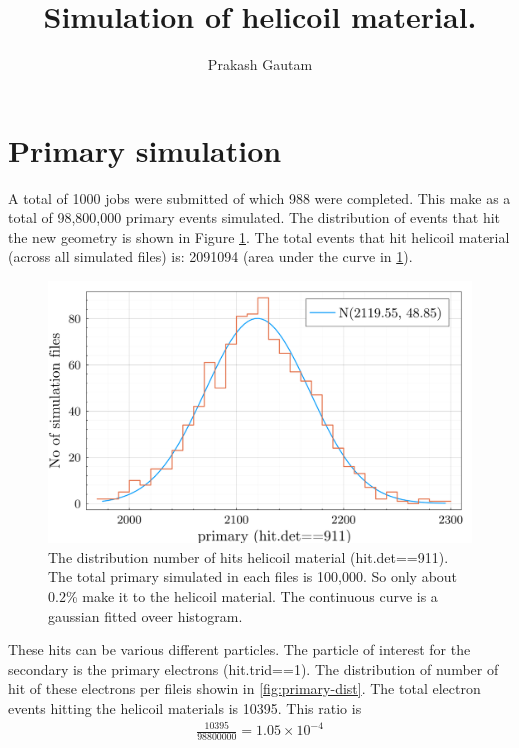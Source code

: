 \documentclass[a4paper,12pt]{article}
\title{Simulation of helicoil material.}
\author{Prakash Gautam}
\begin{document}
\maketitle
\section{Primary simulation}
A total of 1000 jobs were submitted of which 988 were completed. This make as a total of 98,800,000 primary events simulated.  The distribution of events that hit the new geometry is shown in Figure \ref{fig:primary-hit-det}. The total events that hit helicoil material (across all simulated files) is: 2091094 (area under the curve in \ref{fig:primary-hit-det}).


\begin{figure}[h!]
    \centering
    \includegraphics[width=1\linewidth]{image/helicoil-20221121-113016-img-primary-det-hit-count-hist-not-normalized.png}
    \caption{The distribution number of hits helicoil material (hit.det==911). The total primary simulated in each files is 100,000. So only about $0.2$\% make it to the helicoil material. The continuous curve is a gaussian fitted oveer histogram.}
    \label{fig:primary-hit-det}
\end{figure}


These hits can be various different particles. The particle of interest for the secondary is the primary electrons (hit.trid==1).  The distribution of number of hit of these electrons per fileis showin in \ref{fig:primary-dist}. The total electron events hitting the helicoil materials is 10395. This ratio is
\begin{align*}
    \frac{10395}{98800000} = 1.05 \times 10^{-4}
\end{align*}
\end{document}

